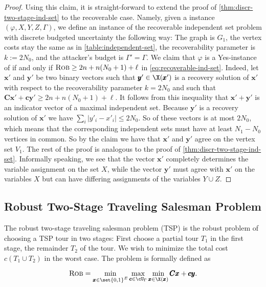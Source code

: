 \documentclass[a4paper,abstracton]{scrartcl}
\begin{document}
\begin{proof}
Using this claim, it is straight-forward to extend the proof of \cref{thm:discr-two-stage-ind-set} to the recoverable case.
 Namely, given a {\radj} instance $(\varphi,X,Y,Z,\Gamma)$, we define an instance of the recoverable independent set problem with discrete budgeted uncertainty the following way: 
 The graph is $G_1$, the vertex costs stay the same as in \cref{table:independent-set}, the recoverability parameter is $k := 2N_0$, and the attacker's budget is $\Gamma' = \Gamma$. 
 We claim that $\varphi$ is a Yes-instance of {\radj} if and only if $\textsc{Rob} \geq 2n + n(N_0+1) + \ell$ in \cref{eq:recoverable-ind-set}.
Indeed, let $\pmb x'$ and $\pmb y'$ be two binary vectors such that $\pmb y' \in \X(\pmb x')$ is a recovery solution of $\pmb x'$ with respect to the recoverability parameter $k = 2N_0$ and such that $\pmb C \pmb x' + \pmb c \pmb y' \geq 2n + n(N_0+1) + \ell$. 
It follows from this inequality that $\pmb x' + \pmb y'$ is an indicator vector of a maximal independent set. 
Because $\pmb y'$ is a recovery solution of $\pmb x'$ we have $\sum_i |y'_i - x'_i| \leq 2N_0$. So  of these vectors is at most $2N_0$, which means that the corresponding independent sets must have at least $N_1 - N_0$ vertices in common.
So by the claim we have that $\pmb x'$ and $\pmb y'$ agree on the vertex set $V_1$. 
The rest of the proof is analogous to the proof of \cref{thm:discr-two-stage-ind-set}.
 Informally speaking, we see that the vector $\pmb x'$ completely determines the variable assignment on the set $X$, while the vector $\pmb y'$ must agree with $\pmb x'$ on the variables $X$ but can have differing assignments of the variables $Y \cup Z$.
\end{proof}

\subsection{Robust Two-Stage Traveling Salesman Problem}
\label{subsec:two-stage-tsp}

The robust two-stage traveling salesman problem (TSP) is the robust problem of choosing a TSP tour in two stages: 
First choose a partial tour $T_1$ in the first stage,  the remainder $T_2$ of the tour.
We wish to minimize the total cost $c(T_1 \cup T_2)$ in the worst case. 
The problem is formally defined as

\begin{equation*}
\textsc{Rob} = \min_{\pmb x \in \set{0,1}^E} \max_{\pmb c \in \cU_\Gamma } \min_{\pmb x \in \X(\pmb x)} \pmb C \pmb x + \pmb c \pmb y. 
\end{equation*} 
\end{document}
